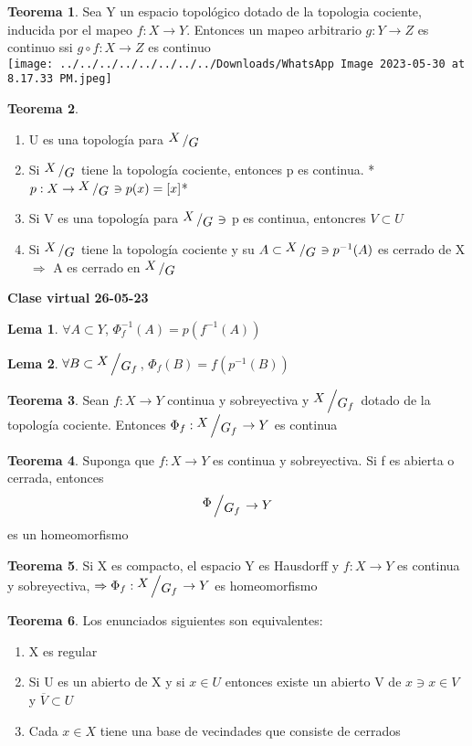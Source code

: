 \documentclass{article}
\theoremstyle{definition}
\newtheorem{theorem}{Teorema}[section]
\newtheorem{lemma}{Lema}[section]
\newcommand{\bigslant}[2]{{\raisebox{.2em}{$#1$}\left/\raisebox{-.2em}{$#2$}\right.}}
\begin{document}
\begin{theorem}
	Sea Y un espacio topológico dotado de la topologia cociente, inducida por el mapeo $f:X\to Y$. Entonces un mapeo arbitrario $g:Y\to Z$ es continuo ssi $g\circ f:X\to Z$ es continuo\\
\texttt{[image: ../../../../../../../../Downloads/WhatsApp Image 2023-05-30 at 8.17.33 PM.jpeg]} 
\end{theorem}
\begin{theorem}

	\begin{enumerate}
		\item U es una topología para $\bigslant{X}{G}$
		\item Si $\bigslant{X}{G}$ tiene la topología cociente, entonces p es continua. *$p:X\to\bigslant{X}{G}\ni p(x)=[x]$*
		\item Si V es una topología para $\bigslant{X}{G}\ni$ p es continua, entoncres $V\subset U$
		\item Si $\bigslant{X}{G}$ tiene la topología cociente y su $A\subset \bigslant{X}{G}\ni p^{-1}(A)$ es cerrado de X $\Rightarrow$ A es cerrado en $\bigslant{X}{G}$
	\end{enumerate}
\end{theorem}
\textbf{Clase virtual 26-05-23}
\begin{lemma}
	$\forall A\subset Y$, $\Phi_f^{-1}(A)=p(f^{-1}(A))$
\end{lemma}
\begin{lemma}
	$\forall B\subset \bigslant{X}{G_f}$, $\Phi_f(B)=f(p^{-1}(B))$
\end{lemma}
\begin{theorem}
	Sean $f:X\to Y$ continua y sobreyectiva y  $\bigslant{X}{G_f}$ dotado de la topología cociente. Entonces $\Phi_f:\bigslant{X}{G_f}\to Y$ es continua
\end{theorem}
\begin{theorem}
	Suponga que $f:X\to Y$ es continua y sobreyectiva. Si f es abierta o cerrada, entonces 
	\[ \bigslant{\Phi}{G_f}\to Y\]
	es un homeomorfismo
\end{theorem}
\begin{theorem}

	Si X es compacto, el espacio Y es Hausdorff y $f:X\to Y$ es continua y sobreyectiva, $\Rightarrow \Phi_f:\bigslant{X}{G_f}\to Y$ es homeomorfismo
\end{theorem}
\begin{theorem}
	Los enunciados siguientes son equivalentes:
	\begin{enumerate}
		\item X es regular
		\item Si U es un abierto de X y si $x\in U$ entonces existe un abierto V de $x\ni x\in V$ y $\overline{V}\subset U$
		\item Cada $x\in X$ tiene una base de vecindades que consiste de cerrados
	\end{enumerate}
\end{theorem}
\end{document}
